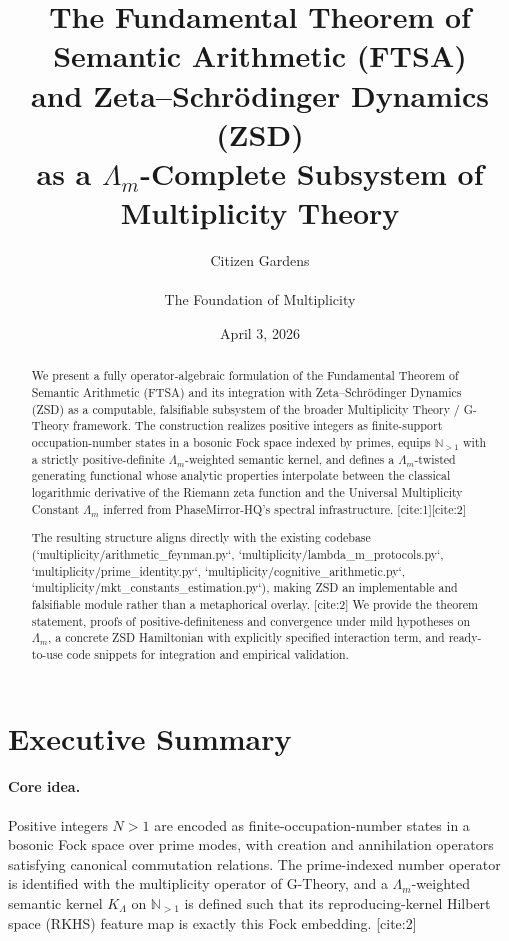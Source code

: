 \documentclass[11pt]{article}
\title{%
  The Fundamental Theorem of Semantic Arithmetic (FTSA) \\
  and Zeta--Schr\"odinger Dynamics (ZSD) \\
  as a $\Lambda_m$-Complete Subsystem of Multiplicity Theory
}
\author{Citizen Gardens \\ \\ The Foundation of Multiplicity}
\date{April 3, 2026}
\begin{document}
\maketitle

\begin{abstract}
We present a fully operator-algebraic formulation of the Fundamental
Theorem of Semantic Arithmetic (FTSA) and its integration with
Zeta--Schr\"odinger Dynamics (ZSD) as a computable, falsifiable
subsystem of the broader Multiplicity Theory / G-Theory framework.
The construction realizes positive integers as finite-support
occupation-number states in a bosonic Fock space indexed by primes,
equips $\mathbb{N}_{>1}$ with a strictly positive-definite
$\Lambda_m$-weighted semantic kernel, and defines a $\Lambda_m$-twisted
generating functional whose analytic properties interpolate between
the classical logarithmic derivative of the Riemann zeta function and
the Universal Multiplicity Constant $\Lambda_m$ inferred from
PhaseMirror-HQ's spectral infrastructure. [cite:1][cite:2]

The resulting structure aligns directly with the existing codebase
(`multiplicity/arithmetic_feynman.py`, `multiplicity/lambda_m_protocols.py`,
`multiplicity/prime_identity.py`, `multiplicity/cognitive_arithmetic.py`,
`multiplicity/mkt_constants_estimation.py`), making ZSD an implementable
and falsifiable module rather than a metaphorical overlay. [cite:2]
We provide the theorem statement, proofs of positive-definiteness
and convergence under mild hypotheses on $\Lambda_m$, a concrete
ZSD Hamiltonian with explicitly specified interaction term, and
ready-to-use code snippets for integration and empirical validation.
\end{abstract}

\section*{Executive Summary}

\paragraph{Core idea.}
Positive integers $N > 1$ are encoded as finite-occupation-number
states in a bosonic Fock space over prime modes, with creation and
annihilation operators satisfying canonical commutation relations.
The prime-indexed number operator is identified with the multiplicity
operator of G-Theory, and a $\Lambda_m$-weighted semantic kernel
$K_{\Lambda}$ on $\mathbb{N}_{>1}$ is defined such that its
reproducing-kernel Hilbert space (RKHS) feature map is exactly this
Fock embedding. [cite:2]
\end{document}
